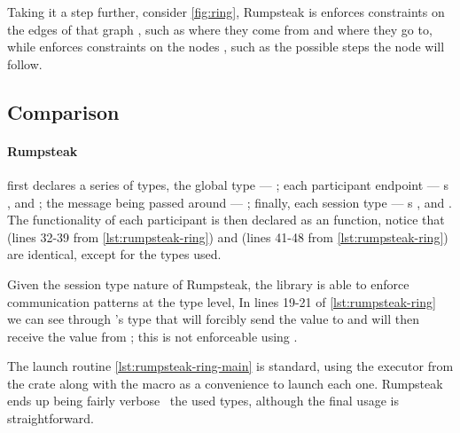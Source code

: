 Taking it a step further, consider \autoref{fig:ring},
Rumpsteak is enforces constraints on the edges of that graph ,
such as where they come from and where they go to,
while \textcolor{attrgreen}{} enforces constraints on the nodes ,
such as the possible steps the node will follow.

\subsection{Comparison}

\paragraph{Rumpsteak} first declares a series of types, the global type --- \textcolor{structblue}{};
each participant endpoint --- s \textcolor{structblue}{}, \textcolor{structblue}{} and \textcolor{structblue}{};
the message being passed around --- \textcolor{structblue}{};
finally, each session type --- s \textcolor{structblue}{}, \textcolor{structblue}{} and \textcolor{structblue}{}.
The functionality of each participant is then declared as an  function,
notice that  (lines 32-39 from \autoref{lst:rumpsteak-ring})
and  (lines 41-48 from \autoref{lst:rumpsteak-ring}) are identical, except for the types used.

Given the session type nature of Rumpsteak, the library is able to enforce communication patterns at the type level,
In lines 19-21 of \autoref{lst:rumpsteak-ring} we can see through 's type that
 will forcibly send the value to  and will then receive the value from ;
this is not enforceable using \textcolor{attrgreen}{}.

The launch routine \autoref{lst:rumpsteak-ring-main} is standard,
using the executor from the  crate along with the  macro as a convenience to launch each one.
Rumpsteak ends up being fairly verbose \wrt~the used types,
although the final usage  is straightforward.

